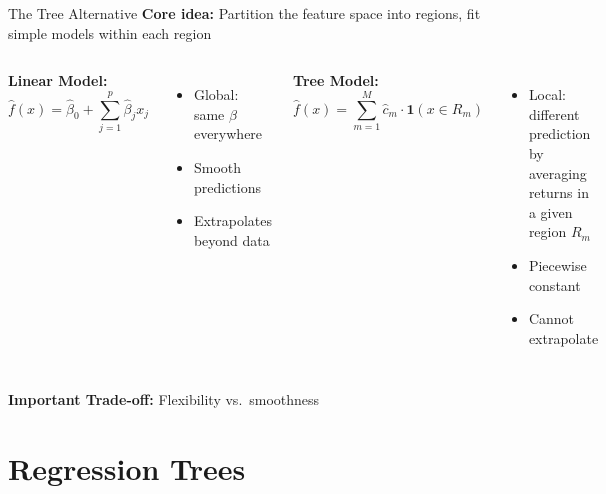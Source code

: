 \documentclass[10pt]{beamer}
\newcommand{\highlight}[1]{\textcolor{AccentOrange}{\textbf{#1}}}
\begin{document}
\begin{frame}{The Tree Alternative}
  \textbf{Core idea:} Partition the feature space into regions, fit simple models within each region

  \vspace{1em}
  \begin{columns}[T]
    \textbf{Linear Model:}
    \[
    \widehat{f}(x) = \widehat{\beta}_0 + \sum_{j=1}^{p} \widehat{\beta}_j x_j
    \]
    \begin{itemize}
      \item Global: same $\beta$ everywhere
      \item Smooth predictions
      \item Extrapolates beyond data
    \end{itemize}

    \textbf{Tree Model:}
    \[
    \widehat{f}(x) = \sum_{m=1}^{M} \widehat{c}_m \cdot \mathbf{1}(x \in R_m)
    \]
    \begin{itemize}
      \item Local: different prediction by averaging returns in a given region $R_m$
      \item Piecewise constant
      \item Cannot extrapolate
    \end{itemize}
  \end{columns}

  \vspace{1.5em}
\highlight{Important Trade-off:} Flexibility vs.\ smoothness
\end{frame}

\section{Regression Trees}
\end{document}
